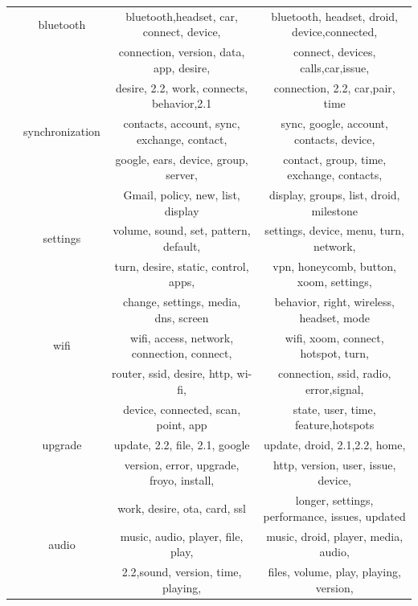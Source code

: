 \documentclass[10pt, conference, compsocconf]{IEEEtran}
\begin{document}
\begin{table}[!htb]
\begin{tabular}{|c||c||c||c|}
& bluetooth & bluetooth,headset, car, connect, device,  &bluetooth,	headset, droid, device,connected, \\
 &&connection, version, data, app, desire, & connect, devices, calls,car,issue,	\\
&&desire,	2.2, work, connects, behavior,2.1 & connection, 2.2, car,pair, time\\ \cline{2-4}
            
  & synchronization&contacts, account, sync, exchange, contact, &sync, google, account, contacts, device, \\
&&google, ears, device, group, server, &contact, group, time, exchange, contacts, \\
&&Gmail, policy, new, list, display&display, groups,  list,  droid, milestone\\ \cline{2-4}
            
  & settings&volume, sound,	set, pattern,  default,&settings, device, menu, turn,	network, \\
 && turn, desire, static, control, apps,&vpn, honeycomb, button, xoom,  settings, \\
  && change, settings, media, dns, screen &behavior,	right, wireless, headset, mode\\
\cline{2-4}

&wifi & wifi, access, network, connection, connect, &wifi, xoom, connect, hotspot, turn, \\
&&router, ssid, desire, http, wi-fi,&connection, ssid, radio, error,signal, \\

&&device, connected, scan, point, app &state, user, time, feature,hotspots\\ \cline{2-4}

&upgrade & update, 2.2, file, 2.1, google  & update, droid, 2.1,2.2, home, \\

 &&version, error, upgrade, froyo, install, & http, version, user, issue, device,\\           
 
 &&work, desire, ota, card, ssl & longer, settings, performance, issues, updated\\            \cline{2-4}
          
&audio& music, audio, player, file, play, &music, droid, player, media, audio,  \\

&&2.2,sound, version, time, playing, & files, volume, play, playing, version,\\


\end{tabular}
\end{table}
\end{document}
